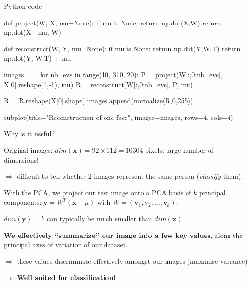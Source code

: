 \documentclass[compress]{beamer}
\begin{document}
\begin{frame}[fragile]{Python code}

\begin{pythoncode}
def project(W, X, mu=None):
    if mu is None:
        return np.dot(X,W)
    return np.dot(X - mu, W)

def reconstruct(W, Y, mu=None):
    if mu is None:
        return np.dot(Y,W.T)
    return np.dot(Y, W.T) + mu

images = []
for nb_evs in range(10, 310, 20):
    P = project(W[:,0:nb_evs], X[0].reshape(1,-1), mu)
    R = reconstruct(W[:,0:nb_evs], P, mu)

    R = R.reshape(X[0].shape)
    images.append(normalize(R,0,255))

subplot(title="Reconstruction of one face", images=images, rows=4, cols=4)
\end{pythoncode}
\end{frame}


\begin{frame}{Why is it useful?}


    Original images: $dim(\mathbf{x}) = 92 \times 112 = 10304$ pixels: large number of dimensions!

    $\Rightarrow$ difficult to tell whether 2 images represent the same person
    (\ie \emph{classify} them).

    \pause

    With the PCA, we project our test image onto a PCA basis of $k$ principal
    components: $\mathbf{y} = W^{T} (\mathbf{x} - \mu)$ with $W = (\mathbf{v}_{1}, \mathbf{v}_{2}, \ldots, \mathbf{v}_{k})$.


    $dim(\mathbf{y}) = k$ can typically be much smaller than $dim(\mathbf{x})$

    \pause

    \textbf{We effectively ``summarize'' our image into a few key values}, along
    the principal axes of variation of our dataset.

    $\Rightarrow$ these values discriminate effectively amongst our images
    (maximise variance)
    
    $\Rightarrow$ \textbf{Well suited for classification!}

\end{frame}

\end{document}
